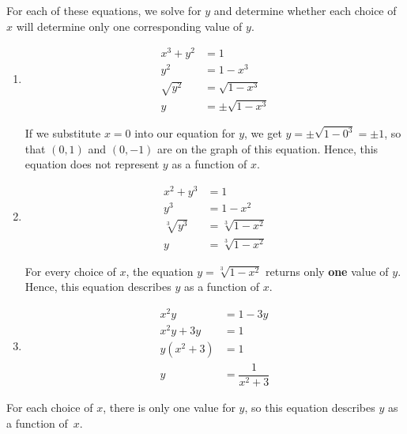 {
For each of these equations, we solve for $y$ and determine whether each choice of $x$ will determine only one corresponding value of $y$.

\begin{enumerate}

\item   \begin{align*}
         x^3 + y^2 & =  1  \\
               y^2 & =  1 - x^3  \\
        \sqrt{y^2} & =  \sqrt{1 - x^3}  \tag*{extract square roots} \\
                 y & =  \pm \sqrt{1 - x^3}  
		\end{align*}

If we substitute $x=0$ into our equation for $y$, we get  $y = \pm \sqrt{1 - 0^3} = \pm 1$, so that $(0,1)$ and $(0,-1)$ are on the graph of this equation. Hence, this equation does not represent $y$ as a function of $x$.

\item  \begin{align*}
          x^2 + y^3 & =  1  \\
          y^3 & =  1 - x^2  \\
          \sqrt[3]{y^3} & =  \sqrt[3]{1 - x^2}\\
          y & = \sqrt[3]{1 - x^2}
       \end{align*}

For every choice of $x$, the equation $y =  \sqrt[3]{1 - x^2}$ returns only \textbf{one} value of $y$.  Hence, this equation describes $y$ as a function of $x$.

\item   \begin{align*}
          x^2y & =  1 - 3y  \\
          x^2y + 3y & =  1  \\
          y \left(x^2 + 3\right) & =  1  \tag*{factor} \\
          y & =  \dfrac{1}{x^2 + 3} 
		\end{align*}
		
\end{enumerate}

For each choice of $x$, there is only one value for $y$, so this equation describes $y$ as a function of~$x$.
}

